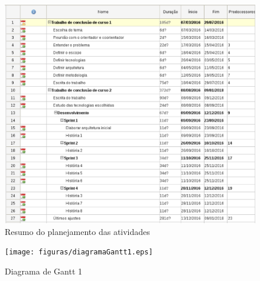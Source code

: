 \begin{figure}[!h]                                                           
\centering                                                                   
\includegraphics [keepaspectratio=true,scale=0.5]{figuras/diagramaGantt3.eps} 
\caption{Resumo do planejamento das atividades}                                   
\label{resumoDoPlanejamento}                                                                                                                  
\end{figure}                                                                 



\begin{landscape}

\begin{figure}[!h]                                                           
\centering                                                                   
\texttt{[image: figuras/diagramaGantt1.eps]} 
\caption{Diagrama de Gantt 1}                               
\label{diagramaGantt1}                                                                                                           
\end{figure}                                                                 

\end{landscape}


